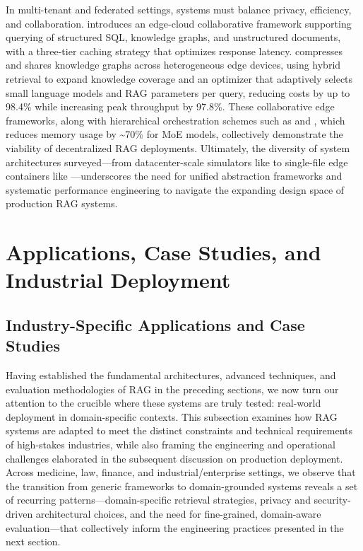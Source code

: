 \documentclass[11pt]{article}
\begin{document}
In multi-tenant and federated settings, systems must balance privacy, efficiency, and collaboration. \cite{ref551} introduces an edge-cloud collaborative framework supporting querying of structured SQL, knowledge graphs, and unstructured documents, with a three-tier caching strategy that optimizes response latency. \cite{ref552} compresses and shares knowledge graphs across heterogeneous edge devices, using hybrid retrieval to expand knowledge coverage and an optimizer that adaptively selects small language models and RAG parameters per query, reducing costs by up to 98.4\% while increasing peak throughput by 97.8\%. These collaborative edge frameworks, along with hierarchical orchestration schemes such as \cite{ref553} and \cite{ref554}, which reduces memory usage by \textasciitilde70\% for MoE models, collectively demonstrate the viability of decentralized RAG deployments. Ultimately, the diversity of system architectures surveyed---from datacenter-scale simulators like \cite{ref536} to single-file edge containers like \cite{ref549}---underscores the need for unified abstraction frameworks and systematic performance engineering to navigate the expanding design space of production RAG systems.

\section{Applications, Case Studies, and Industrial Deployment}

\subsection{Industry-Specific Applications and Case Studies}

Having established the fundamental architectures, advanced techniques, and evaluation methodologies of RAG in the preceding sections, we now turn our attention to the crucible where these systems are truly tested: real-world deployment in domain-specific contexts. This subsection examines how RAG systems are adapted to meet the distinct constraints and technical requirements of high-stakes industries, while also framing the engineering and operational challenges elaborated in the subsequent discussion on production deployment. Across medicine, law, finance, and industrial/enterprise settings, we observe that the transition from generic frameworks to domain-grounded systems reveals a set of recurring patterns---domain-specific retrieval strategies, privacy and security-driven architectural choices, and the need for fine-grained, domain-aware evaluation---that collectively inform the engineering practices presented in the next section.
\end{document}
